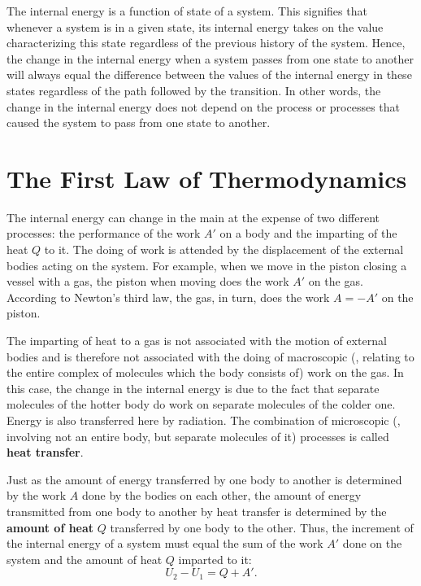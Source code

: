 The internal energy is a function of state of a system. This signifies that whenever a system is in a given state, its internal energy takes on the value characterizing this state regardless of the previous history of the system. Hence, the change in the internal energy when a system passes from one state to another will always equal the difference between the values of the internal energy in these states regardless of the path followed by the transition. In other words, the change in the internal energy does not depend on the process or processes that caused the system to pass from one state to another.

\section{The First Law of Thermodynamics}\label{sec:10_5}

The internal energy can change in the main at the expense of two different processes: the performance of the work $A'$ on a body and the imparting of the heat $Q$ to it. The doing of work is attended by the displacement of the external bodies acting on the system. For example, when we move in the piston closing a vessel with a gas, the piston when moving does the work $A'$ on the gas. According to Newton's third law, the gas, in turn, does the work $A=-A'$ on the piston.

The imparting of heat to a gas is not associated with the motion of external bodies and is therefore not associated with the doing of macroscopic (\ie, relating to the entire complex of molecules which the body consists of) work on the gas. In this case, the change in the internal energy is due  to the fact that separate molecules of the hotter body do work on separate molecules of the colder one. Energy is also transferred here by radiation. The combination of microscopic (\ie, involving not an entire body, but separate molecules of it) processes is called \textbf{heat transfer}.

Just as the amount of energy transferred by one body to another is determined by the work $A$ done by the bodies on each other, the amount of energy transmitted from one body to another by heat transfer is determined by the \textbf{amount of heat} $Q$ transferred by one body to the other. Thus, the increment of the internal energy of a system must equal the sum of the work $A'$ done on the system and the amount of heat $Q$ imparted to it:
\begin{equation}\label{eq:10_6}
	U_2 - U_1 = Q + A'.
\end{equation}

